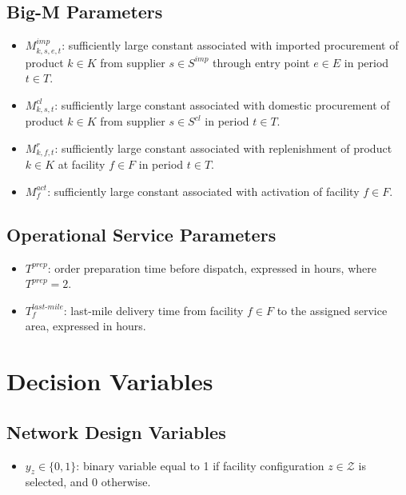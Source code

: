 \documentclass[12pt]{article}
\begin{document}
\subsection{Big-M Parameters}

\begin{itemize}
    \item $M^{imp}_{k,s,e,t}$: sufficiently large constant associated with imported procurement of product $k \in K$ from supplier $s \in S^{imp}$ through entry point $e \in E$ in period $t \in T$.

    \item $M^{cl}_{k,s,t}$: sufficiently large constant associated with domestic procurement of product $k \in K$ from supplier $s \in S^{cl}$ in period $t \in T$.

    \item $M^{r}_{k,f,t}$: sufficiently large constant associated with replenishment of product $k \in K$ at facility $f \in F$ in period $t \in T$.

    \item $M^{act}_f$: sufficiently large constant associated with activation of facility $f \in F$.
\end{itemize}

\subsection{Operational Service Parameters}

\begin{itemize}
    \item $T^{prep}$: order preparation time before dispatch, expressed in hours, where $T^{prep} = 2$.

    \item $T^{last\text{-}mile}_{f}$: last-mile delivery time from facility $f \in F$ to the assigned service area, expressed in hours.
\end{itemize}

\newpage

\section{Decision Variables}

\subsection{Network Design Variables}
\begin{itemize}
    \item $y_z \in \{0,1\}$: binary variable equal to 1 if facility configuration $z \in \mathcal{Z}$ is selected, and 0 otherwise.
\end{itemize}
\end{document}

